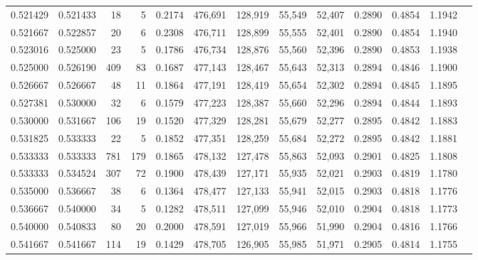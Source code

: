 \begin{tabular}{rrrrrrrrrrrrr}
0.521429 & 0.521433 &     18 &      5 &                                     0.2174 & 476,691 & 128,919 &  55,549 &  52,407 & 0.2890 & 0.4854 & 1.1942 \\
0.521667 & 0.522857 &     20 &      6 &                                     0.2308 & 476,711 & 128,899 &  55,555 &  52,401 & 0.2890 & 0.4854 & 1.1940 \\
0.523016 & 0.525000 &     23 &      5 &                                     0.1786 & 476,734 & 128,876 &  55,560 &  52,396 & 0.2890 & 0.4853 & 1.1938 \\
0.525000 & 0.526190 &    409 &     83 &                                     0.1687 & 477,143 & 128,467 &  55,643 &  52,313 & 0.2894 & 0.4846 & 1.1900 \\
0.526667 & 0.526667 &     48 &     11 &                                     0.1864 & 477,191 & 128,419 &  55,654 &  52,302 & 0.2894 & 0.4845 & 1.1895 \\
0.527381 & 0.530000 &     32 &      6 &                                     0.1579 & 477,223 & 128,387 &  55,660 &  52,296 & 0.2894 & 0.4844 & 1.1893 \\
0.530000 & 0.531667 &    106 &     19 &                                     0.1520 & 477,329 & 128,281 &  55,679 &  52,277 & 0.2895 & 0.4842 & 1.1883 \\
0.531825 & 0.533333 &     22 &      5 &                                     0.1852 & 477,351 & 128,259 &  55,684 &  52,272 & 0.2895 & 0.4842 & 1.1881 \\
0.533333 & 0.533333 &    781 &    179 &                                     0.1865 & 478,132 & 127,478 &  55,863 &  52,093 & 0.2901 & 0.4825 & 1.1808 \\
0.533333 & 0.534524 &    307 &     72 &                                     0.1900 & 478,439 & 127,171 &  55,935 &  52,021 & 0.2903 & 0.4819 & 1.1780 \\
0.535000 & 0.536667 &     38 &      6 &                                     0.1364 & 478,477 & 127,133 &  55,941 &  52,015 & 0.2903 & 0.4818 & 1.1776 \\
0.536667 & 0.540000 &     34 &      5 &                                     0.1282 & 478,511 & 127,099 &  55,946 &  52,010 & 0.2904 & 0.4818 & 1.1773 \\
0.540000 & 0.540833 &     80 &     20 &                                     0.2000 & 478,591 & 127,019 &  55,966 &  51,990 & 0.2904 & 0.4816 & 1.1766 \\
0.541667 & 0.541667 &    114 &     19 &                                     0.1429 & 478,705 & 126,905 &  55,985 &  51,971 & 0.2905 & 0.4814 & 1.1755 \\

\end{tabular}
